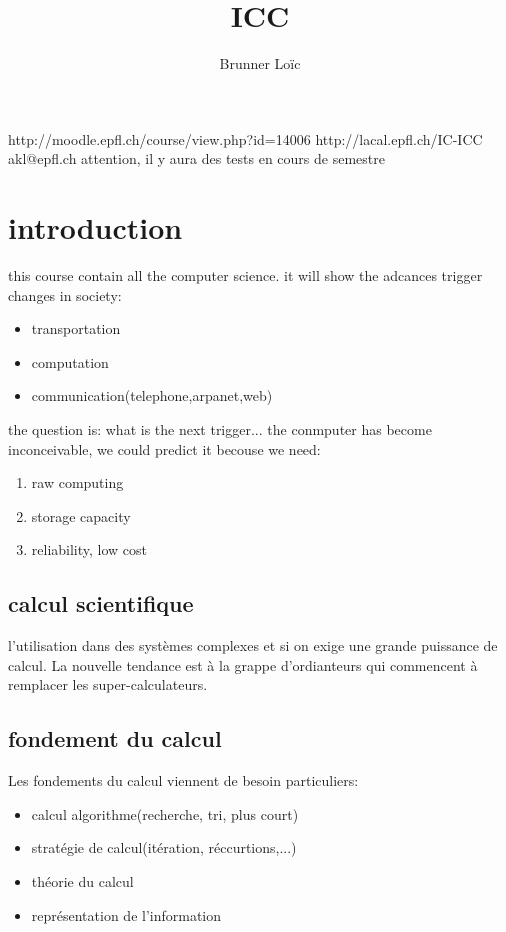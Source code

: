 \documentclass[a4paper,10pt]{article}
\title{ICC}
\author{Brunner Loïc}
\begin{document}
\maketitle


\subsection{}
http://moodle.epfl.ch/course/view.php?id=14006
\newline
http://lacal.epfl.ch/IC-ICC
\newline
akl@epfl.ch
\newline
attention, il y aura des tests en cours de semestre
\section{introduction}
this course contain all the computer science. it will show the adcances trigger changes in society:
\begin{itemize}
 \item transportation
 \item computation
 \item communication(telephone,arpanet,web)
\end{itemize}
the question is: what is the next trigger...
\newline
the conmputer has become inconceivable, we could predict it becouse we need:
\begin{enumerate}
 \item raw computing
 \item storage capacity
 \item reliability, low cost
\end{enumerate}
\subsection{calcul scientifique}
l'utilisation dans des systèmes complexes et si on exige une grande puissance de calcul. La nouvelle tendance est à la grappe d'ordianteurs qui commencent à remplacer les super-calculateurs.
\subsection{fondement du calcul}
Les fondements du calcul viennent de besoin particuliers:
\begin{itemize}
 \item calcul algorithme(recherche, tri, plus court)
 \item stratégie de calcul(itération, réccurtions,...)
 \item théorie du calcul
 \item représentation de l'information
\end{itemize}
\end{document}
